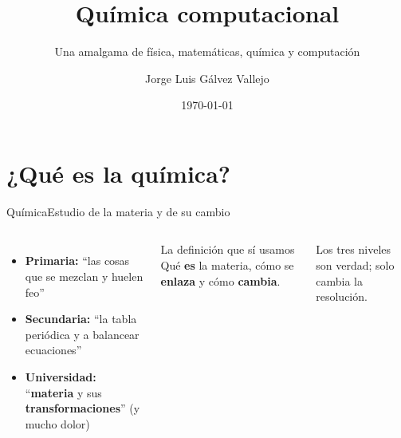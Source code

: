 \documentclass[aspectratio=169]{beamer}
\title[Química computacional]{Química computacional}
\subtitle{Una amalgama de física, matemáticas, química y computación}
\author[Jorge L. Gálvez Vallejo]{Jorge Luis Gálvez Vallejo}
\institute{NCI \textperiodcentered\ ANU}
\date{\today}
\newcommand{\cplx}[1]{{\footnotesize\color{cookieMuted}#1}}
\begin{document}
\maketitle

\section{¿Qué es la química?}

\begin{frame}{Química}{Estudio de la materia y de su cambio}
  \begin{columns}[T,onlytextwidth]
      \begin{itemize}\setlength\itemsep{6pt}
        \item \textbf{Primaria:} ``las cosas que se mezclan y huelen feo''
        \item \textbf{Secundaria:} ``la tabla periódica y a balancear ecuaciones''
        \item \textbf{Universidad:} ``\textbf{materia} y sus \textbf{transformaciones}'' \cplx{(y mucho dolor)}
      \end{itemize}
      \begin{block}{La definición que sí usamos}
        Qué \textbf{es} la materia, cómo se \textbf{enlaza} y cómo \textbf{cambia}.
      \end{block}
      \cplx{Los tres niveles son verdad; solo cambia la resolución.}
  \end{columns}
\end{frame}
\end{document}
